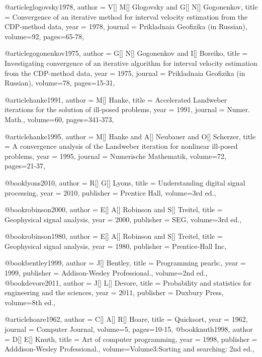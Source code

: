 {@article{glogovsky1978,
  author =	 {V[] M[] Glogovsky and G[] N[] Gogonenkov},
  title =	 {Convergence of an iterative method for interval velocity estimation from the CDP-method data},
  year =	 1978,
  journal =	 {Prikladnaia Geofizika (in Russian)},
  volume={92},
 pages=65-78,
}


@article{gogonenkov1975,
  author =	 {G[] N[] Gogonenkov and I[] Boreiko},
  title =	 {Investigating convergence of an iterative algorithm for interval velocity estimation from the CDP-method data},
  year =	 1975,
  journal =	 {Prikladnaia Geofizika (in Russian)},
  volume={78},
 pages=15-31,
}


@article{hanke1991,
  author =	 {M[] Hanke},
  title =	 {Accelerated Landweber iterations for the solution of ill-posed problems},
  year =	 1991,
  journal =	 {Numer. Math.},
  volume={60},
 pages=341-373,
}


@article{hanke1995,
  author =	 {M[] Hanke and A[] Neubauer and O[] Scherzer},
  title =	 {A convergence analysis of the Landweber iteration for nonlinear ill-posed problems},
  year =	 1995,
  journal =	 {Numerische Mathematik},
  volume={72},
 pages=21-37,
}

@book{lyons2010,
  author =	 {R[] G[] Lyons},
  title =	 {Understanding digital signal processing},
  year =	 2010,
  publisher =	 {Prentice Hall},
  volume={3rd ed.},
}

@book{robinson2000,
  author =	 {E[] A[] Robinson and S[] Treitel},
  title =	 {Geophysical signal analysis},
  year =	 2000,
  publisher =	 {SEG},
  volume={3rd ed.},
}

@book{robinson1980,
  author =	 {E[] A[] Robinson and S[] Treitel},
  title =	 {Geophysical signal analysis},
  year =	 1980,
  publisher =	 {Prentice-Hall Inc},
}

@book{bentley1999,
  author =	 {J[] Bentley},
  title =	 {Programming pearls:},
  year =	 1999,
  publisher =	 {Addison-Wesley Professional.},
  volume={2nd ed.},
}
@book{devore2011,
  author =	 {J[] L[] Devore},
  title =	 {Probability and statistics for engineering and the sciences},
  year =	 2011,
  publisher =	 {Duxbury Press},
  volume={8th ed.},
}

@article{hoare1962,
  author =	 {C[] A[] R[] Hoare},
  title =	 {Quicksort},
  year =	 1962,
  journal =	 {Computer Journal},
  volume={5},
 pages=10-15,
}
@book{knuth1998,
  author =	 {D[] E[] Knuth},
  title =	 {Art of computer programming},
  year =	 1998,
  publisher =	 { Adddison-Wesley Professional.},
  volume={Volume3:Sorting and searching: 2nd ed.},
}

}
